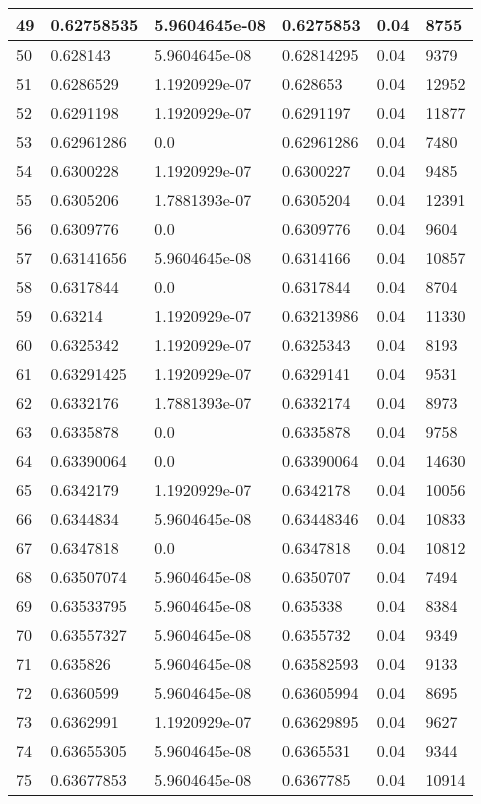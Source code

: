\begin{longtable}{|l|l|l|l|l|l|}
49 & 0.62758535 & 5.9604645e-08 & 0.6275853 & 0.04 & 8755 \\ \hline 
50 & 0.628143 & 5.9604645e-08 & 0.62814295 & 0.04 & 9379 \\ \hline 
51 & 0.6286529 & 1.1920929e-07 & 0.628653 & 0.04 & 12952 \\ \hline 
52 & 0.6291198 & 1.1920929e-07 & 0.6291197 & 0.04 & 11877 \\ \hline 
53 & 0.62961286 & 0.0 & 0.62961286 & 0.04 & 7480 \\ \hline 
54 & 0.6300228 & 1.1920929e-07 & 0.6300227 & 0.04 & 9485 \\ \hline 
55 & 0.6305206 & 1.7881393e-07 & 0.6305204 & 0.04 & 12391 \\ \hline 
56 & 0.6309776 & 0.0 & 0.6309776 & 0.04 & 9604 \\ \hline 
57 & 0.63141656 & 5.9604645e-08 & 0.6314166 & 0.04 & 10857 \\ \hline 
58 & 0.6317844 & 0.0 & 0.6317844 & 0.04 & 8704 \\ \hline 
59 & 0.63214 & 1.1920929e-07 & 0.63213986 & 0.04 & 11330 \\ \hline 
60 & 0.6325342 & 1.1920929e-07 & 0.6325343 & 0.04 & 8193 \\ \hline 
61 & 0.63291425 & 1.1920929e-07 & 0.6329141 & 0.04 & 9531 \\ \hline 
62 & 0.6332176 & 1.7881393e-07 & 0.6332174 & 0.04 & 8973 \\ \hline 
63 & 0.6335878 & 0.0 & 0.6335878 & 0.04 & 9758 \\ \hline 
64 & 0.63390064 & 0.0 & 0.63390064 & 0.04 & 14630 \\ \hline 
65 & 0.6342179 & 1.1920929e-07 & 0.6342178 & 0.04 & 10056 \\ \hline 
66 & 0.6344834 & 5.9604645e-08 & 0.63448346 & 0.04 & 10833 \\ \hline 
67 & 0.6347818 & 0.0 & 0.6347818 & 0.04 & 10812 \\ \hline 
68 & 0.63507074 & 5.9604645e-08 & 0.6350707 & 0.04 & 7494 \\ \hline 
69 & 0.63533795 & 5.9604645e-08 & 0.635338 & 0.04 & 8384 \\ \hline 
70 & 0.63557327 & 5.9604645e-08 & 0.6355732 & 0.04 & 9349 \\ \hline 
71 & 0.635826 & 5.9604645e-08 & 0.63582593 & 0.04 & 9133 \\ \hline 
72 & 0.6360599 & 5.9604645e-08 & 0.63605994 & 0.04 & 8695 \\ \hline 
73 & 0.6362991 & 1.1920929e-07 & 0.63629895 & 0.04 & 9627 \\ \hline 
74 & 0.63655305 & 5.9604645e-08 & 0.6365531 & 0.04 & 9344 \\ \hline 
75 & 0.63677853 & 5.9604645e-08 & 0.6367785 & 0.04 & 10914 \\ \hline 
\end{longtable}